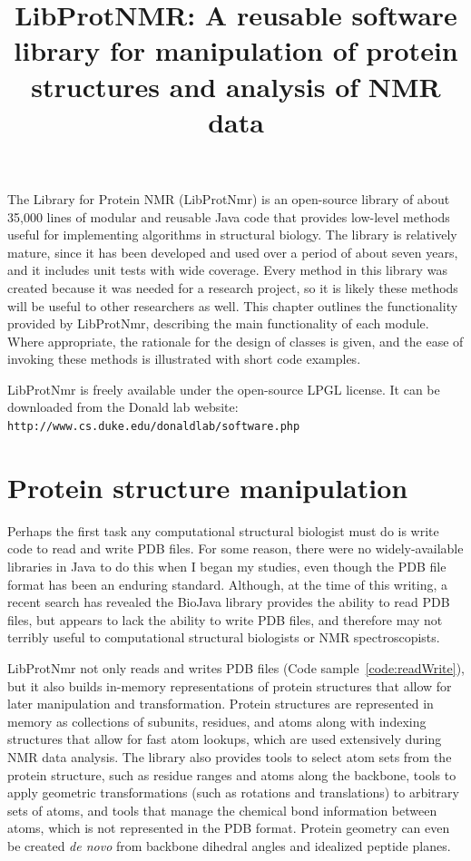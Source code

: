\documentclass[11pt]{article}
\newcommand{\software}[1]{{\sc #1}}
\newcommand{\coderef}[1]{Code sample~\ref{#1}}
\newcommand{\libprotnmr}{\software{LibProtNmr}}
\begin{document}
\title{LibProtNMR: A reusable software library for manipulation of protein structures and analysis of NMR data}
\maketitle


The Library for Protein NMR ({\libprotnmr}) is an open-source library of about 35,000 lines of modular and reusable Java code that provides low-level methods useful for implementing algorithms in structural biology. The library is relatively mature, since it has been developed and used over a period of about seven years, and it includes unit tests with wide coverage. Every method in this library was created because it was needed for a research project, so it is likely these methods will be useful to other researchers as well. This chapter outlines the functionality provided by {\libprotnmr}, describing the main functionality of each module. Where appropriate, the rationale for the design of classes is given, and the ease of invoking these methods is illustrated with short code examples.

{\libprotnmr} is freely available under the open-source LPGL license. It can be downloaded from the Donald lab website:
\\
{\tt http://www.cs.duke.edu/donaldlab/software.php}


\section{Protein structure manipulation}

Perhaps the first task any computational structural biologist must do is write code to read and write PDB files. For some reason, there were no widely-available libraries in Java to do this when I began my studies, even though the PDB file format has been an enduring standard. Although, at the time of this writing, a recent search has revealed the \software{BioJava} library provides the ability to read PDB files, but appears to lack the ability to write PDB files, and therefore may not terribly useful to computational structural biologists or NMR spectroscopists.

{\libprotnmr} not only reads and writes PDB files (\coderef{code:readWrite}), but it also builds in-memory representations of protein structures that allow for later manipulation and transformation. Protein structures are represented in memory as collections of subunits, residues, and atoms along with indexing structures that allow for fast atom lookups, which are used extensively during NMR data analysis. The library also provides tools to select atom sets from the protein structure, such as residue ranges and atoms along the backbone, tools to apply geometric transformations (such as rotations and translations) to arbitrary sets of atoms, and tools that manage the chemical bond information between atoms, which is not represented in the PDB format. Protein geometry can even be created {\it de novo} from backbone dihedral angles and idealized peptide planes.
\end{document}
